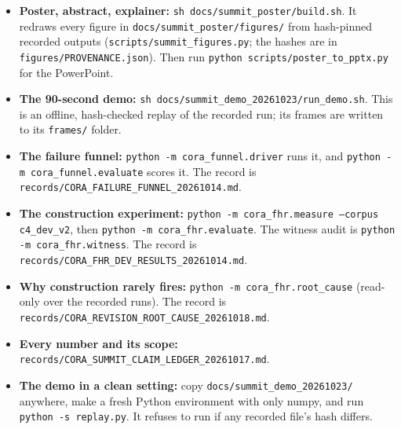 \documentclass[11pt]{article}
\newcommand{\bigpart}[1]{\par\vspace{1.2em}{\Large\bfseries #1}\par\vspace{0.1em}}
\begin{document}
\bigpart{Part 5. How to reproduce what you see}
\begin{itemize}
  \item \textbf{Poster, abstract, explainer:} \texttt{sh docs/summit\_poster/build.sh}. It redraws every figure in
    \texttt{docs/summit\_poster/figures/} from hash-pinned recorded outputs (\texttt{scripts/summit\_figures.py};
    the hashes are in \texttt{figures/PROVENANCE.json}). Then run \texttt{python scripts/poster\_to\_pptx.py} for the
    PowerPoint.
  \item \textbf{The 90-second demo:} \texttt{sh docs/summit\_demo\_20261023/run\_demo.sh}. This is an offline,
    hash-checked replay of the recorded run; its frames are written to its \texttt{frames/} folder.
  \item \textbf{The failure funnel:} \texttt{python -m cora\_funnel.driver} runs it, and \texttt{python -m
    cora\_funnel.evaluate} scores it. The record is \texttt{records/CORA\_FAILURE\_FUNNEL\_20261014.md}.
  \item \textbf{The construction experiment:} \texttt{python -m cora\_fhr.measure --corpus c4\_dev\_v2}, then
    \texttt{python -m cora\_fhr.evaluate}. The witness audit is \texttt{python -m cora\_fhr.witness}. The record is
    \texttt{records/CORA\_FHR\_DEV\_RESULTS\_20261014.md}.
  \item \textbf{Why construction rarely fires:} \texttt{python -m cora\_fhr.root\_cause} (read-only over the
    recorded runs). The record is \texttt{records/CORA\_REVISION\_ROOT\_CAUSE\_20261018.md}.
  \item \textbf{Every number and its scope:} \texttt{records/CORA\_SUMMIT\_CLAIM\_LEDGER\_20261017.md}.
  \item \textbf{The demo in a clean setting:} copy \texttt{docs/summit\_demo\_20261023/} anywhere, make a fresh
    Python environment with only numpy, and run \texttt{python -s replay.py}. It refuses to run if any
    recorded file's hash differs.
\end{itemize}
\end{document}
